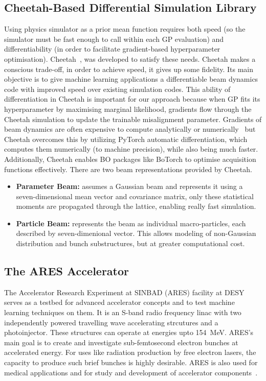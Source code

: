 \subsection{Cheetah-Based Differential Simulation Library}

Using physics simulator as a prior mean function requires both speed (so the simulator must be fast enough to call within each GP evaluation) and differentiability (in order to facilitate gradient-based 
hyperparameter optimisation). Cheetah~\cite{kaiser2024bridging}, was developed to satisfy these needs. Cheetah makes a conscious trade-off, in order to achieve speed, it gives up some fidelity. 
Its main objective is to give machine learning applications a differentiable beam dynamics code with improved speed over existing simulation codes.
This ability of differentiation in Cheetah is important for our approach because when GP fits its hyperparameter by maximising marginal likelihood, gradients flow through the Cheetah simulation to update the trainable misalignment parameter. 
Gradients of beam dynamics are often expensive to compute analytically or numerically~\cite{kaiser2024bridging} 
but Cheetah overcomes this by utilizing PyTorch automatic differentiation, which computes them numerically (to machine precision), while also being much faster.
Additionally, Cheetah enables BO packages like BoTorch to optimise acquisition functions effectively. There are two beam representations provided by Cheetah. 


\begin{itemize}
    \item \textbf{Parameter Beam:} assumes a Gaussian beam and represents it using a seven-dimensional mean vector and covariance matrix, only these statistical moments are propagated through the lattice, enabling really fast simulation. 
    \item \textbf{Particle Beam:} represents the beam as individual macro-particles, each described by seven-dimenional vector. This allows modeling of non-Gaussian distribution and bunch substructures, but at greater computational cost. 
\end{itemize}


\subsection{The ARES Accelerator}

The Accelerator Research Experiment at SINBAD (ARES) facility at DESY serves as a testbed for advanced accelerator concepts and to test machine learning 
techniques on them. It is an S-band radio frequency linac with two independently powered travelling wave accelerating strcutures and a photoinjector. These structures can operate at energies upto \SI{154}{MeV}. 
ARES's main goal is to create and investigate sub-femtosecond electron bunches at accelerated energy. For uses like radiation production by free electron lasers, the capacity to produce such brief bunches is highly desirable. ARES is also used for medical applications and for study and development of accelerator components~\cite{kaiser2024rl}.    \

